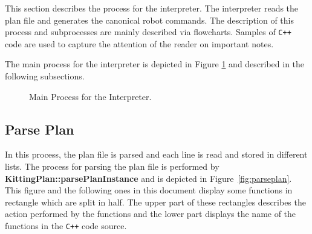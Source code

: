 
This section describes the process for the interpreter. The interpreter reads the plan file and generates the canonical robot commands. The description of this process and subprocesses are mainly described via flowcharts. Samples of \verb!C++! code are used to capture the attention of the reader on important notes.

The main process for the interpreter is depicted in Figure \ref{fig:interpreter} and described in the following subsections.


\begin{figure}[h!]
\centering
{}
\caption{Main Process for the Interpreter.}
\label{fig:interpreter}
\end{figure}
\newpage


\subsection{Parse Plan}
In this process, the plan file is parsed and each line is read and stored in different lists. The process for parsing the plan file is performed by \textbf{\small{KittingPlan::parsePlanInstance}} and is depicted in Figure~\ref{fig:parseplan}. This figure and the following ones in this document display some functions in rectangle which are split in half. The upper part of these rectangles describes the action performed by the functions and the lower part displays the name of the functions in the \verb!C++! code source.


